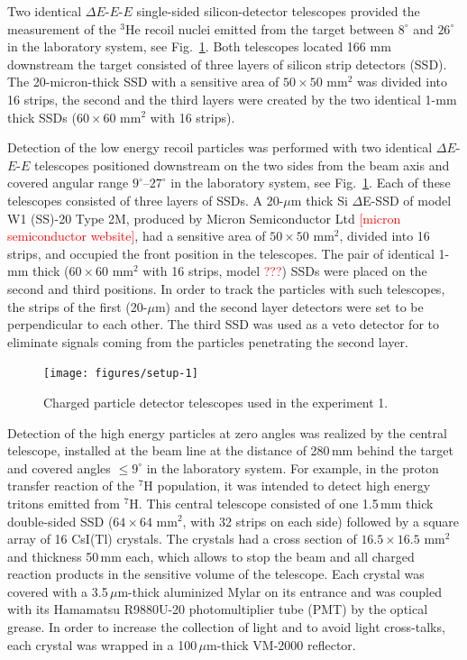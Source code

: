 Two identical $\Delta E$-$E$-$E$ single-sided silicon-detector telescopes provided the measurement of the $^3$He recoil nuclei emitted from the target between $8^{\circ}$ and $26^{\circ}$ in the laboratory system, see Fig.\ \ref{fig:setup-1}.
Both telescopes located 166 mm downstream the target consisted of three layers of silicon strip detectors (SSD).
The 20-micron-thick SSD with a sensitive area of $50 \times 50$ mm$^2$ was divided into 16 strips, the second and the third layers were created by the two identical 1-mm thick SSDs ($60 \times 60$ mm$^2$ with 16 strips).

Detection of the low energy recoil particles was performed with two identical $\Delta E$-$E$-$E$  telescopes positioned downstream on the two sides from the beam axis and covered angular range $9^{\circ}$–$27^{\circ}$ in the laboratory system, see Fig.\ \ref{fig:setup-1}.
Each of these telescopes consisted of three layers of SSDs. 
A 20-$\mu$m thick Si $\Delta$E-SSD of model W1 (SS)-20 Type 2M, produced by Micron Semiconductor Ltd \textcolor{red}{[micron semiconductor website]}, had a sensitive area of $50 \times 50$ mm$^2$, divided into 16 strips, and occupied the front position in the telescopes.
The pair of identical 1-mm thick ($60 \times 60$ mm$^2$ with 16 strips, model \textcolor{red}{???}) SSDs were placed on the second and third positions.
In order to track the particles with such telescopes, the strips of the first (20-$\mu$m) and the second layer detectors were set to be perpendicular to each other. 
The third SSD was used as a veto detector for to eliminate signals coming from the particles penetrating the second layer.

\begin{figure}
	\begin{center}
		\texttt{[image: figures/setup-1]}
	\end{center}
	\caption{Charged particle detector telescopes used in the experiment 1.}
	\label{fig:setup-1}
\end{figure}

Detection of the high energy particles at zero angles was realized by the central telescope, installed at the beam line at the distance of 280\,mm behind the target and covered angles $\leq9^{\circ}$ in the laboratory system.
For example, in the proton transfer reaction of the $^7$H population, it was intended to detect high energy tritons emitted from $^7$H.
This central telescope consisted of one 1.5\,mm thick double-sided SSD ($64 \times 64$ mm$^2$, with 32 strips on each side) followed by a square array of 16 CsI(Tl) crystals.
The crystals had a cross section of $16.5\times16.5$ mm$^2$ and thickness 50\,mm each, which allows to stop the beam and all charged reaction products in the sensitive volume of the telescope.
Each crystal was covered with a 3.5\,$\mu$m-thick aluminized Mylar on its entrance and was coupled with its Hamamatsu R9880U-20 photomultiplier tube (PMT) by the optical grease.
In order to increase the collection of light and to avoid light cross-talks, each crystal was wrapped in a 100\,$\mu$m-thick VM-2000 reflector.
